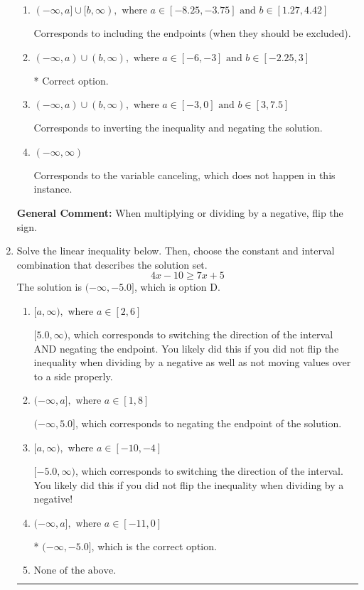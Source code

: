 \documentclass{extbook}[14pt]
\newcommand{\litem}[1]{\item #1

\rule{\textwidth}{0.4pt}}
\begin{document}
\begin{enumerate}
{\begin{enumerate}[label=\Alph*.]
Corresponds to including the endpoints AND negating.
\item \( (-\infty, a] \cup [b, \infty), \text{ where } a \in [-8.25, -3.75] \text{ and } b \in [1.27, 4.42] \)

Corresponds to including the endpoints (when they should be excluded).
\item \( (-\infty, a) \cup (b, \infty), \text{ where } a \in [-6, -3] \text{ and } b \in [-2.25, 3] \)

 * Correct option.
\item \( (-\infty, a) \cup (b, \infty), \text{ where } a \in [-3, 0] \text{ and } b \in [3, 7.5] \)

Corresponds to inverting the inequality and negating the solution.
\item \( (-\infty, \infty) \)

Corresponds to the variable canceling, which does not happen in this instance.
\end{enumerate}

\textbf{General Comment:} When multiplying or dividing by a negative, flip the sign.
}
\litem{
Solve the linear inequality below. Then, choose the constant and interval combination that describes the solution set.
\[ 4x -10 \geq 7x + 5 \]The solution is \( (-\infty, -5.0] \), which is option D.\begin{enumerate}[label=\Alph*.]
\item \( [a, \infty), \text{ where } a \in [2, 6] \)

 $[5.0, \infty)$, which corresponds to switching the direction of the interval AND negating the endpoint. You likely did this if you did not flip the inequality when dividing by a negative as well as not moving values over to a side properly.
\item \( (-\infty, a], \text{ where } a \in [1, 8] \)

 $(-\infty, 5.0]$, which corresponds to negating the endpoint of the solution.
\item \( [a, \infty), \text{ where } a \in [-10, -4] \)

 $[-5.0, \infty)$, which corresponds to switching the direction of the interval. You likely did this if you did not flip the inequality when dividing by a negative!
\item \( (-\infty, a], \text{ where } a \in [-11, 0] \)

* $(-\infty, -5.0]$, which is the correct option.
\item \( \text{None of the above}. \)


\end{enumerate}}
\end{enumerate}
\end{document}
